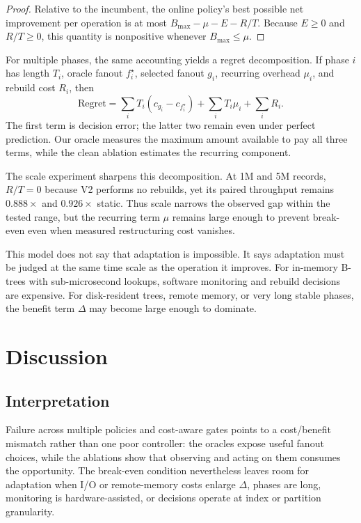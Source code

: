\documentclass[sigconf,review,anonymous]{acmart}
\begin{document}
\begin{proof}
Relative to the incumbent, the online policy's best possible net improvement
per operation is at most
\(B_{\max}-\mu-E-R/T\).  Because \(E\ge0\) and \(R/T\ge0\), this quantity is
nonpositive whenever \(B_{\max}\le\mu\).
\end{proof}

For multiple phases, the same accounting yields a regret decomposition.  If
phase \(i\) has length \(T_i\), oracle fanout \(f_i^\star\), selected fanout
\(g_i\), recurring overhead \(\mu_i\), and rebuild cost \(R_i\), then
\[
 \mathrm{Regret}=
 \sum_i T_i\!\left(c_{g_i}-c_{f_i^\star}\right)
 +\sum_i T_i\mu_i+\sum_i R_i.
\]
The first term is decision error; the latter two remain even under perfect
prediction.  Our oracle measures the maximum amount available to pay all three
terms, while the clean ablation estimates the recurring component.

The scale experiment sharpens this decomposition.  At 1M and 5M records,
\(R/T=0\) because V2 performs no rebuilds, yet its paired throughput remains
\(0.888\times\) and \(0.926\times\) static.  Thus scale narrows the observed
gap within the tested range, but the recurring term \(\mu\) remains large
enough to prevent break-even even when measured restructuring cost vanishes.

This model does not say that adaptation is impossible.  It says adaptation must
be judged at the same time scale as the operation it improves.  For in-memory
B-trees with sub-microsecond lookups, software monitoring and rebuild decisions
are expensive.  For disk-resident trees, remote memory, or very long stable
phases, the benefit term \(\Delta\) may become large enough to dominate.

\section{Discussion}
\label{sec:discussion}

\subsection{Interpretation}

Failure across multiple policies and cost-aware gates points to a cost/benefit
mismatch rather than one poor controller: the oracles expose useful fanout
choices, while the ablations show that observing and acting on them consumes
the opportunity.  The break-even condition nevertheless leaves room for
adaptation when I/O or remote-memory costs enlarge \(\Delta\), phases are long,
monitoring is hardware-assisted, or decisions operate at index or partition
granularity.
\end{document}
